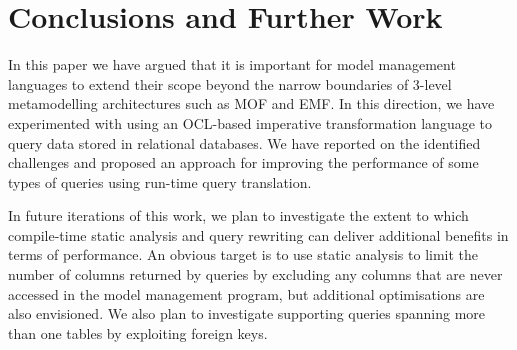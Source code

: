 \section{Conclusions and Further Work}
\label{sec:conclusions}

In this paper we have argued that it is important for model management languages to extend their scope beyond the narrow boundaries of 3-level metamodelling architectures such as MOF and EMF. In this direction, we have experimented with  using an OCL-based imperative transformation language to query data stored in relational databases. We have reported on the identified challenges and proposed an approach for improving the performance of some types of queries using run-time query translation.

In future iterations of this work, we plan to investigate the extent to which compile-time static analysis and query rewriting can deliver additional benefits in terms of performance. An obvious target is to use static analysis to limit the number of columns returned by queries by excluding any columns that are never accessed in the model management program, but additional optimisations are also envisioned. We also plan to investigate supporting queries spanning more than one tables by exploiting foreign keys.